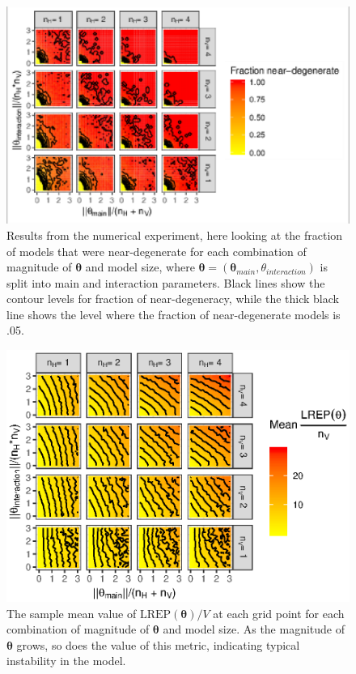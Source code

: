 \documentclass[]{article}
\theoremstyle{definition}
\begin{document}
\par
\begin{figure}
\includegraphics{paper_files/figure-latex/degen-plots-1} \caption{Results from the numerical experiment, here looking at the fraction of models that were near-degenerate for each combination of magnitude of $\boldsymbol \theta$ and model size, where $\boldsymbol \theta = (\boldsymbol \theta_{main}, \theta_{interaction})$ is split into main and interaction parameters. Black lines show the contour levels for fraction of near-degeneracy, while the thick black line shows the level where the fraction of near-degenerate models is .05.}\label{fig:degen-plots}
\end{figure}
\begin{figure}
\includegraphics{paper_files/figure-latex/instab-plots-1} \caption{The sample mean value of $\text{LREP}(\boldsymbol \theta)/V$ at each grid point for each combination of magnitude of $\boldsymbol \theta$ and model size. As the magnitude of $\boldsymbol \theta$ grows, so does the value of this metric, indicating typical instability in the model.}\label{fig:instab-plots}
\end{figure}
\end{document}
